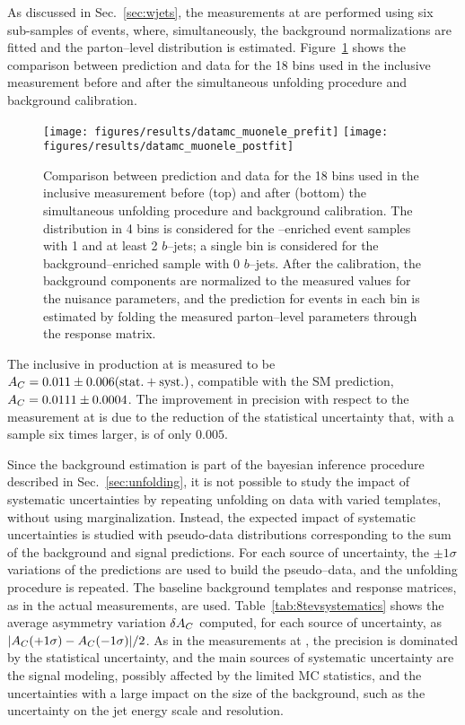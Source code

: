 As discussed in Sec.~\ref{sec:wjets}, the measurements at \eighttev{}
are performed using six sub-samples of \ljets{} events,
where, simultaneously, the background normalizations are fitted and
the parton--level \dy{} distribution is
estimated. Figure~\ref{fig:dy8tev} shows the comparison between
prediction and data for the 18 bins used in the inclusive \ac{}
measurement before and after the simultaneous unfolding procedure and
background calibration.
\begin{figure}[!htb]\centering
  \texttt{[image: figures/results/datamc\_muonele\_prefit]} 
  \texttt{[image: figures/results/datamc\_muonele\_postfit]} 
  \caption{Comparison between prediction and data for the 18 bins used
  in the inclusive \ac{} measurement before (top) and after (bottom)
  the simultaneous unfolding procedure and background calibration. The
  \dy{} distribution in 4 bins is considered for the
  \ttbar{}--enriched event samples with 1 and at least 2 $b$--jets; a
  single bin is considered for the background--enriched sample with 0
  $b$--jets. After the calibration, the background components are
  normalized to the measured values for the nuisance parameters, and
  the prediction for \ttbar{} events in each bin is estimated by
  folding the measured parton--level parameters through the response
  matrix.}
  \label{fig:dy8tev}
\end{figure}
The inclusive \ac{} in \ttbar{} production at \eighttev{} is measured to be
$A_C{}= 0.011\pm0.006(\rm{stat.+syst.})$, compatible with the SM prediction,
$A_C{}=0.0111\pm0.0004$. The improvement in precision with respect to
the measurement at \seventev{} is due to the reduction of the
statistical uncertainty that, with a \ttbar{} sample six times larger,
is of only $0.005$. 

Since the background estimation is part of the bayesian inference
procedure described in Sec.~\ref{sec:unfolding}, it is not possible to
study the impact of systematic uncertainties by repeating unfolding on data with
varied templates, without using marginalization. Instead, the expected
impact of systematic uncertainties is studied with pseudo-data distributions
corresponding to the sum of the background and signal predictions.
For each source of uncertainty, the $\pm{}1\sigma$ variations of the
predictions are used to build the pseudo--data, and the unfolding
procedure is repeated. The baseline background templates and response
matrices, as in the actual measurements, are used.
Table~\ref{tab:8tevsystematics} shows the average asymmetry variation
$\delta{\ensuremath{A_C}{}}$ computed, for each source of uncertainty, as
$|A_C{}(+1\sigma)-A_C{}(-1\sigma)|/2$.
As in the measurements at \seventev{}, the precision is dominated by
the statistical uncertainty, and the main sources of systematic
uncertainty are the signal modeling, possibly affected by the limited
MC statistics, and the uncertainties with a large impact on the size of the
\wjets{} background, such as the uncertainty on the jet energy scale
and resolution. 

